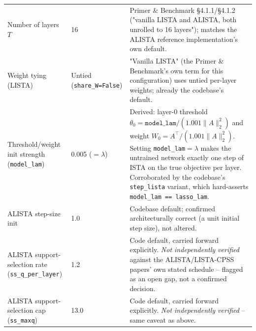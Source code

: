 \begin{longtable}{@{} l l p{7.6cm} @{}}
\addlinespace
\multicolumn{3}{@{}l}{\textbf{Model-based (LISTA / ALISTA) -- architecture}} \\
\midrule
Number of layers $T$ & 16 & Primer \& Benchmark \S4.1.1/\S4.1.2 ("vanilla LISTA and ALISTA, both unrolled to 16 layers"); matches the ALISTA reference implementation's own default. \\
Weight tying (LISTA) & Untied (\texttt{share\_W=False}) & "Vanilla LISTA" (the Primer \& Benchmark's own term for this configuration) uses untied per-layer weights; already the codebase's default. \\
Threshold/weight init strength (\texttt{model\_lam}) & 0.005 ($=\lambda$) & Derived: layer-0 threshold $\theta_0 = \texttt{model\_lam}/(1.001\lVert A\rVert_2^2)$ and weight $W_0 = A^\top/(1.001\lVert A\rVert_2^2)$. Setting \texttt{model\_lam}$=\lambda$ makes the untrained network exactly one step of ISTA on the true objective per layer. Corroborated by the codebase's \texttt{step\_lista} variant, which hard-asserts \texttt{model\_lam == lasso\_lam}. \\
ALISTA step-size init & 1.0 & Codebase default; confirmed architecturally correct (a unit initial step size), not altered. \\
ALISTA support-selection rate (\texttt{ss\_q\_per\_layer}) & 1.2 & Code default, carried forward explicitly. \emph{Not independently verified} against the ALISTA/LISTA-CPSS papers' own stated schedule -- flagged as an open gap, not a confirmed decision. \\
ALISTA support-selection cap (\texttt{ss\_maxq}) & 13.0 & Code default, carried forward explicitly. \emph{Not independently verified} -- same caveat as above. \\


\end{longtable}
